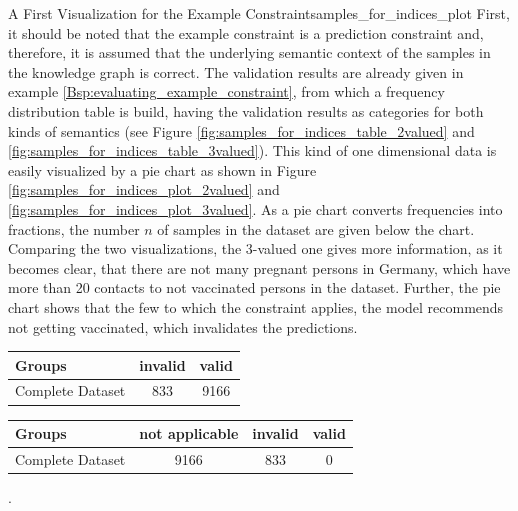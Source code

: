 \begin{Bsp}{A First Visualization for the Example Constraint}{samples_for_indices_plot}
    First, it should be noted that the example constraint is a prediction constraint and, therefore, it is assumed that the underlying semantic context of the samples in the knowledge graph is correct. 
    The validation results are already given in example \ref{Bsp:evaluating_example_constraint}, from which a frequency distribution table is build, having the validation results as categories for both kinds of semantics (see Figure \ref{fig:samples_for_indices_table_2valued} and \ref{fig:samples_for_indices_table_3valued}). This kind of one dimensional data is easily visualized by a pie chart as shown in Figure \ref{fig:samples_for_indices_plot_2valued} and \ref{fig:samples_for_indices_plot_3valued}. As a pie chart converts frequencies into fractions, the number $n$ of samples in the dataset are given below the chart. Comparing the two visualizations, the 3-valued one gives more information, as it becomes clear, that there are not many pregnant persons in Germany, which have more than 20 contacts to not vaccinated persons in the dataset. Further, the pie chart shows that the few to which the constraint applies, the model recommends not getting vaccinated, which invalidates the predictions. 
    
    \captionsetup{type=htypei}
    \begin{minipage}[t]{\linewidth}
        \vspace{1ex}
        \centering
        \begin{tabular}{l|cc}
            \toprule
             Groups & invalid & valid\\
             \midrule
             Complete Dataset & 833 & 9166\\
             \bottomrule
        \end{tabular}    
        \label{fig:samples_for_indices_table_2valued}
    \end{minipage}
    
    \captionsetup{type=htypei}
    \begin{minipage}[t]{\linewidth}
        \vspace{1ex}
        \centering
        \begin{tabular}{l|ccc}
            \toprule
             Groups & not applicable & invalid & valid \\
             \midrule
             Complete Dataset & 9166 & 833 & 0 \\
             \bottomrule
        \end{tabular}  
        \label{fig:samples_for_indices_table_3valued}
    \end{minipage}.


\end{Bsp}
